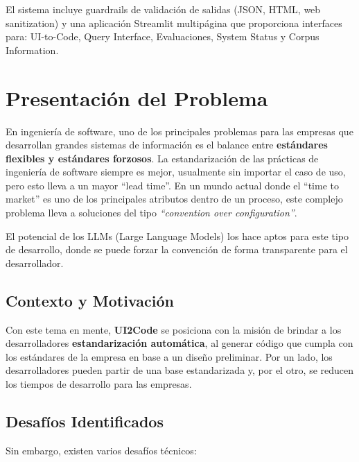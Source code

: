 \documentclass[12pt,a4paper]{article}
\begin{document}
El sistema incluye guardrails de validación de salidas (JSON, HTML, web sanitization) y una aplicación Streamlit multipágina que proporciona interfaces para: UI-to-Code, Query Interface, Evaluaciones, System Status y Corpus Information.

\section{Presentación del Problema}

En ingeniería de software, uno de los principales problemas para las empresas que desarrollan grandes sistemas de información es el balance entre \textbf{estándares flexibles y estándares forzosos}. La estandarización de las prácticas de ingeniería de software siempre es mejor, usualmente sin importar el caso de uso, pero esto lleva a un mayor ``lead time''. En un mundo actual donde el ``time to market'' es uno de los principales atributos dentro de un proceso, este complejo problema lleva a soluciones del tipo \textit{``convention over configuration''}. 

El potencial de los LLMs (Large Language Models) los hace aptos para este tipo de desarrollo, donde se puede forzar la convención de forma transparente para el desarrollador.

\subsection{Contexto y Motivación}

Con este tema en mente, \textbf{UI2Code} se posiciona con la misión de brindar a los desarrolladores \textbf{estandarización automática}, al generar código que cumpla con los estándares de la empresa en base a un diseño preliminar. Por un lado, los desarrolladores pueden partir de una base estandarizada y, por el otro, se reducen los tiempos de desarrollo para las empresas.

\subsection{Desafíos Identificados}

Sin embargo, existen varios desafíos técnicos:
\end{document}
